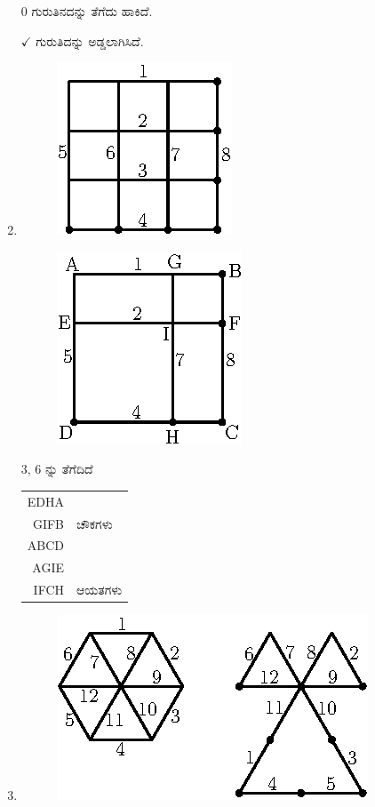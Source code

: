 \begin{enumerate}
$0$ ಗುರುತಿನದನ್ನು ತೆಗೆದು ಹಾಕಿದೆ. 

$\checkmark$ ಗುರುತಿದನ್ನು ಅಡ್ಡಲಾಗಿಸಿದೆ. 

\item
\begin{figure}[!h]
\centering
\includegraphics{images/chap5/q9.eps}
\end{figure}

\begin{figure}[!h]
\centering
\includegraphics{images/chap5/ans9.eps}
\end{figure}

3, 6 ನ್ನು ತೆಗೆದಿದೆ

\begin{tabular}{rl}
EDHA & \\
GIFB & ಚೌಕಗಳು \\
ABCD & \\[0.2cm]
AGIE & \\
IFCH & ಆಯತಗಳು
\end{tabular}

\item
\begin{figure}[!h]
\centering
\includegraphics{images/chap5/ans10.eps}
\end{figure}


\end{enumerate}
